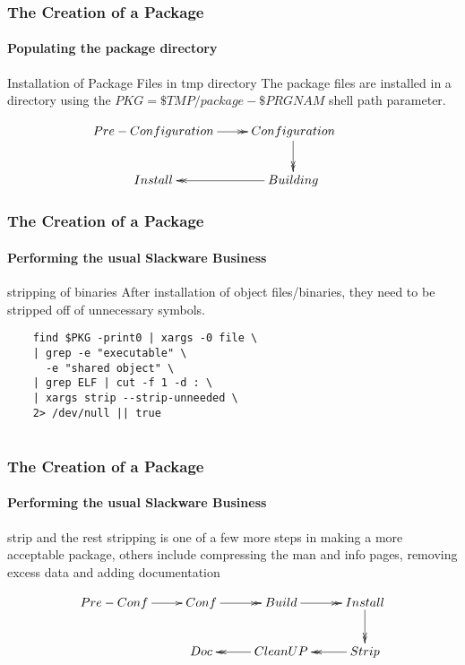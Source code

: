 \documentclass[12pt,hyperref={pdfpagelabels=true}]{beamer}
\begin{document}
\begin{frame}[fragile]
  \frametitle{The Creation of a Package}
  \framesubtitle{Populating the package directory}
  \begin{block}{Installation of Package Files in tmp directory}
    The package files are installed in a directory using the
    $PKG=\$TMP/package-\$PRGNAM$ shell path parameter.
  \end{block}

  
  \begin{equation*}
    \xymatrix@C=2pc@R=2pc{
      Pre-Configuration\ar@{->>}[r] & Configuration\ar@{->>}[d] & \\
      Install & Building\ar@{->>}[l]}
  \end{equation*}
\end{frame}

\begin{frame}[fragile]
  \frametitle{The Creation of a Package}
  \framesubtitle{Performing the usual Slackware Business}
  \begin{block}{stripping of binaries}
    After installation of object files/binaries, they need to be stripped off of
    unnecessary symbols.
  \end{block}
  
  \pause
  
  \begin{lstlisting}
    find $PKG -print0 | xargs -0 file \
    | grep -e "executable" \
      -e "shared object" \
    | grep ELF | cut -f 1 -d : \
    | xargs strip --strip-unneeded \
    2> /dev/null || true
    
  \end{lstlisting}
  
\end{frame}

\begin{frame}
  \frametitle{The Creation of a Package}
  \framesubtitle{Performing the usual Slackware Business}
  
  \begin{block}{strip and the rest}
    stripping is one of a few more steps in making a more acceptable package,
    others include compressing the man and info pages, removing excess data and
    adding documentation
  \end{block}
  
  \pause
  
  \begin{equation*}
    \xymatrix@C=2pc@R=2pc{
      Pre-Conf\ar@{->}[r] & Conf\ar@{->>}[r] &
      Build\ar@{->>}[r] & Install\ar@{->>}[d]\\
      & Doc & CleanUP\ar@{->>}[l] & Strip\ar@{->>}[l]}
  \end{equation*}
  
\end{frame}
\end{document}
